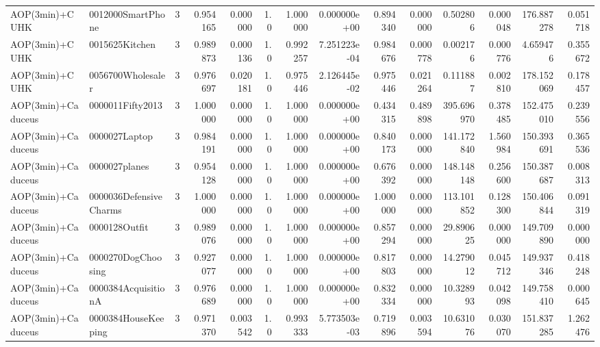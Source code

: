 \begin{tabular}{llrr|r|rr|rr|rr|rrr}
           AOP(3min)+CUHK &      0012000SmartPhone &       3 & 0.954165 & 0.000000 &  1.0 &      1.000000 & 0.000000e+00 &      0.894340 & 0.000000 &      0.502806 &    0.000048 &   176.887278 &    0.051718 \\
           AOP(3min)+CUHK &         0015625Kitchen &       3 & 0.989873 & 0.000136 &  1.0 &      0.992257 & 7.251223e-04 &      0.984676 & 0.000778 &      0.002176 &    0.000776 &     4.659476 &    0.355672 \\
           AOP(3min)+CUHK &      0056700Wholesaler &       3 & 0.976697 & 0.020181 &  1.0 &      0.975446 & 2.126445e-02 &      0.975446 & 0.021264 &      0.111887 &    0.002810 &   178.152069 &    0.178457 \\
       AOP(3min)+Caduceus &       0000011Fifty2013 &       3 & 1.000000 & 0.000000 &  1.0 &      1.000000 & 0.000000e+00 &      0.434315 & 0.489898 &    395.696970 &    0.378485 &   152.475010 &    0.239556 \\
       AOP(3min)+Caduceus &          0000027Laptop &       3 & 0.984191 & 0.000000 &  1.0 &      1.000000 & 0.000000e+00 &      0.840173 & 0.000000 &    141.172840 &    1.560984 &   150.393691 &    0.365536 \\
       AOP(3min)+Caduceus &          0000027planes &       3 & 0.954128 & 0.000000 &  1.0 &      1.000000 & 0.000000e+00 &      0.676392 & 0.000000 &    148.148148 &    0.256600 &   150.387687 &    0.008313 \\
       AOP(3min)+Caduceus & 0000036DefensiveCharms &       3 & 1.000000 & 0.000000 &  1.0 &      1.000000 & 0.000000e+00 &      1.000000 & 0.000000 &    113.101852 &    0.128300 &   150.406844 &    0.091319 \\
       AOP(3min)+Caduceus &          0000128Outfit &       3 & 0.989076 & 0.000000 &  1.0 &      1.000000 & 0.000000e+00 &      0.857294 & 0.000000 &     29.890625 &    0.000000 &   149.709890 &    0.000000 \\
       AOP(3min)+Caduceus &     0000270DogChoosing &       3 & 0.927077 & 0.000000 &  1.0 &      1.000000 & 0.000000e+00 &      0.817803 & 0.000000 &     14.279012 &    0.045712 &   149.937346 &    0.418248 \\
       AOP(3min)+Caduceus &    0000384AcquisitionA &       3 & 0.976689 & 0.000000 &  1.0 &      1.000000 & 0.000000e+00 &      0.832334 & 0.000000 &     10.328993 &    0.042098 &   149.758410 &    0.000645 \\
       AOP(3min)+Caduceus &    0000384HouseKeeping &       3 & 0.971370 & 0.003542 &  1.0 &      0.993333 & 5.773503e-03 &      0.719896 & 0.003594 &     10.631076 &    0.030070 &   151.837285 &    1.262476 \\

\end{tabular}
